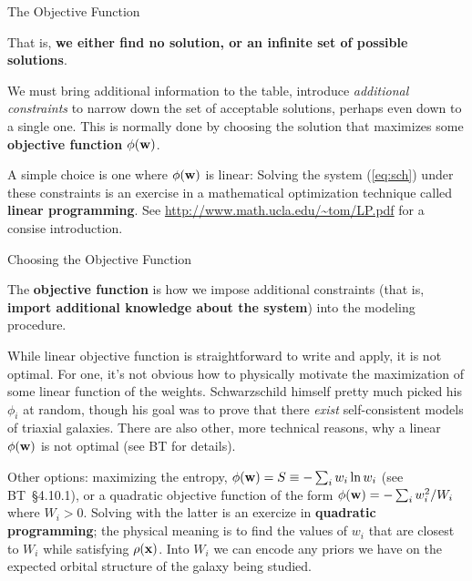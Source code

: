 \documentclass[letterpaper,landscape]{slides}
\begin{document}
\begin{slide}
\begin{center}
{\large \color{red} 
                  The Objective Function  }
\end{center}

That is, {\bf we either find no solution, or an infinite set of possible
solutions}.

We must bring additional information to the table, introduce {\em additional
constraints} to narrow down the set of acceptable solutions, perhaps even
down to a single one.  This is normally done by choosing the solution that
maximizes some {\bf objective function $\phi({\bf w})$}.

A simple choice is one where $\phi({\bf w})$ is linear:
Solving the system (\ref{eq:sch}) under these constraints is an exercise in
a mathematical optimization technique called {\bf linear programming}. See
\url{http://www.math.ucla.edu/~tom/LP.pdf} for a consise introduction.

\vfill
\end{slide}

\begin{slide}
\begin{center}
{\large \color{red} 
                  Choosing the Objective Function  }
\end{center}

The {\bf objective function} is how we impose additional constraints (that is,
{\bf import additional knowledge about the system}) into the modeling procedure.

While linear objective function is straightforward to write and apply, it is
not optimal. For one, it's not obvious how to physically motivate the maximization
of some linear function of the weights. Schwarzschild himself pretty much
picked his $\phi_i$ at random, though his goal was to prove that there {\em
exist} self-consistent models of triaxial galaxies. There are also other,
more technical reasons, why a linear $\phi({\bf w})$ is not optimal (see BT
for details).

Other options: maximizing the entropy, $\phi({\bf w}) = S \equiv -\sum_i w_i
\ln w_i$ (see BT~\S4.10.1), or a quadratic objective function of the form
$\phi({\bf w}) = - \sum_i w_i^2/W_i$ where $W_i > 0$. Solving with the latter is an
exercize in {\bf quadratic programming}; the physical meaning is to find the
values of $w_i$ that are closest to $W_i$ while satisfying $\rho({\bf x})$. 
Into $W_i$ we can encode any priors we have on the expected orbital
structure of the galaxy being studied.

\vfill
\end{slide}
\end{document}
